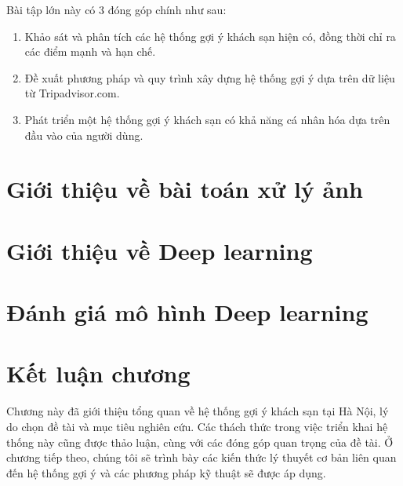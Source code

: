 Bài tập lớn này có 3 đóng góp chính như sau:

\begin{enumerate}
\item Khảo sát và phân tích các hệ thống gợi ý khách sạn hiện có, đồng thời chỉ ra các điểm mạnh và hạn chế.
\item Đề xuất phương pháp và quy trình xây dựng hệ thống gợi ý dựa trên dữ liệu từ Tripadvisor.com.
\item Phát triển một hệ thống gợi ý khách sạn có khả năng cá nhân hóa dựa trên đầu vào của người dùng.
\end{enumerate}

\section{Giới thiệu về bài toán xử lý ảnh}


\section{Giới thiệu về Deep learning}

\section{Đánh giá mô hình Deep learning}
\section*{Kết luận chương}
Chương này đã giới thiệu tổng quan về hệ thống gợi ý khách sạn tại Hà Nội, lý do chọn đề tài và mục tiêu nghiên cứu. Các thách thức trong việc triển khai hệ thống này cũng được thảo luận, cùng với các đóng góp quan trọng của đề tài. Ở chương tiếp theo, chúng tôi sẽ trình bày các kiến thức lý thuyết cơ bản liên quan đến hệ thống gợi ý và các phương pháp kỹ thuật sẽ được áp dụng.




